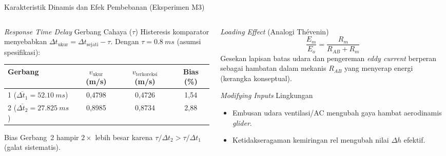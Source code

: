 \documentclass[aspectratio=169,10pt]{beamer}
\newcommand{\sm}{\fontsize{8.2}{10.2}\selectfont}
\newcommand{\xs}{\fontsize{7.1}{9}\selectfont}
\begin{document}
\begin{frame}{Karakteristik Dinamis dan Efek Pembebanan (Eksperimen M3)}
\begin{columns}[T,onlytextwidth]
\begin{column}{.50\textwidth}
\begin{block}{\textit{Response Time Delay} Gerbang Cahaya ($\tau$)}\sm
Histeresis komparator menyebabkan $\Delta t_{\mathrm{ukur}} = \Delta t_{\mathrm{sejati}} - \tau$. Dengan $\tau = \SI{0,8}{ms}$ (asumsi spesifikasi):
\par\vspace{1.5mm}\centering\xs
\setlength{\tabcolsep}{3.5pt}\begin{tabular}{@{}lccc@{}}
\toprule
\textbf{Gerbang} & $v_{\mathrm{ukur}}$ (m/s) & $v_{\mathrm{terkoreksi}}$ (m/s) & \textbf{Bias (\%)}\\
\midrule
1 ($\overline{\Delta t_1} = \SI{52,10}{ms}$) & 0,4798 & 0,4726 & 1,54\\
2 ($\overline{\Delta t_2} = \SI{27,825}{ms}$) & 0,8985 & 0,8734 & 2,88\\
\bottomrule
\end{tabular}
\par\vspace{1.5mm}\raggedright\sm
Bias Gerbang~2 hampir $2\times$ lebih besar karena $\tau/\Delta t_2 > \tau/\Delta t_1$ (galat sistematis).
\end{block}
\end{column}

\begin{column}{.48\textwidth}
\begin{exampleblock}{\textit{Loading Effect} (Analogi Th\'evenin)}\sm
$$\frac{E_m}{E_o} = \frac{R_m}{R_{AB} + R_m}$$
Gesekan lapisan batas udara dan pengereman \textit{eddy current} berperan sebagai hambatan dalam mekanis $R_{AB}$ yang menyerap energi (kerangka konseptual).
\end{exampleblock}
\begin{alertblock}{\textit{Modifying Inputs} Lingkungan}\sm
\begin{itemize}
\item Embusan udara ventilasi/AC mengubah gaya hambat aerodinamis \textit{glider}.
\item Ketidakseragaman kemiringan rel mengubah nilai $\Delta h$ efektif.
\end{itemize}
\end{alertblock}
\end{column}
\end{columns}
\end{frame}
\end{document}
